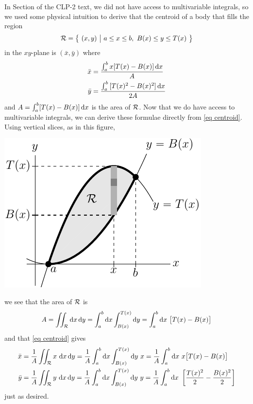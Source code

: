 \begin{eg}\label{eg dblInt I}
In Section  of the CLP-2 text, we did not
have access to multivariable integrals, so we used some physical intuition
to derive that the centroid of a body that fills the
region
\begin{equation*}
\cR=\big\{\ (x,y)\ \big|\ a\le x\le b,\ B(x)\le y\le T(x)\ \big\}
\end{equation*}
in the $xy$-plane is $(\bar x,\bar y)$ where
\begin{align*}
\bar x &= \frac{\int_a^b x [T(x)-B(x)]\,\mathrm{d}x}{A} \\
\bar y &= \frac{\int_a^b\, [T(x)^2-B(x)^2]\,\mathrm{d}x}{2A}
\end{align*}
and $A=\int_a^b [T(x)-B(x)]\,\mathrm{d}x$ is the area of $\mathcal{R}$. Now that we
do have access to multivariable integrals, we can derive these
formulae directly from \eqref{eq centroid}. Using vertical slices,
as in this figure,
\begin{efig}
\begin{center}
   \includegraphics{centroidXY.pdf}\qquad\qquad
\end{center}
\end{efig}
we see that the area of $\mathcal{R}$ is
\begin{align*}
A= \iint_{\mathcal{R}}\mathrm{d}x\,\mathrm{d}y 
 =\int_a^b\mathrm{d}x\int_{B(x)}^{T(x)}\mathrm{d}y
 =\int_a^b\mathrm{d}x\ \big[T(x)-B(x)\big]
\end{align*}
and that \eqref{eq centroid} gives
\begin{align*}
\bar x&= \frac{1}{A} \dblInt_\cR x\ \dee{x}\,\dee{y}
      = \frac{1}{A} \int_a^b\dee{x}\int_{B(x)}^{T(x)}\dee{y}\ x
      =\frac{1}{A}\int_a^b\dee{x}\ x\big[T(x)-B(x)\big] \\
\bar y&= \frac{1}{A} \dblInt_\cR y\ \dee{x}\,\dee{y}
      = \frac{1}{A} \int_a^b\dee{x}\int_{B(x)}^{T(x)}\dee{y}\ y
      =\frac{1}{A}\int_a^b\dee{x}\ 
             \left[\frac{T(x)^2}{2}-\frac{B(x)^2}{2}\right] 
\end{align*}
just as desired.
\end{eg}

